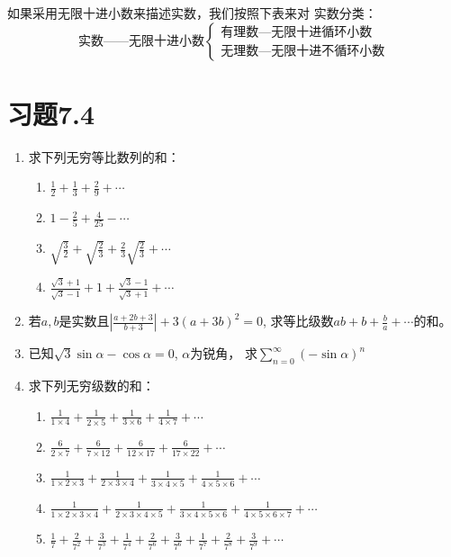 如果采用无限十进小数来描述实数，我们按照下表来对
实数分类：
\[\text{实数——无限十进小数}\begin{cases}
    \text{有理数—无限十进循环小数}\\
    \text{无理数—无限十进不循环小数}
\end{cases}\]

\section*{习题7.4}
\begin{enumerate}
    \item 求下列无穷等比数列的和：
    \begin{multicols}{2}
\begin{enumerate}
    \item $\frac{1}{2}+\frac{1}{3}+\frac{2}{9}+\cdots$
    \item $1-\frac{2}{5}+\frac{4}{25}-\cdots$
    \item $\sqrt{\frac{3}{2}}+\sqrt{\frac{2}{3}}+\frac{2}{3}\sqrt{\frac{2}{3}}+\cdots$
    \item $\frac{\sqrt{3}+1}{\sqrt{3}-1}+1+\frac{\sqrt{3}-1}{\sqrt{3}+1}+\cdots$
\end{enumerate}        
    \end{multicols}


\item 若$a,b$是实数且$\left|\frac{a+2b+3}{b+3}\right|+3(a+3b)^2=0$, 求等比级数$ab+b+\frac{b}{a}+\cdots$的和。
\item 已知$\sqrt{3}\sin\alpha-\cos\alpha=0$, $\alpha$为锐角，
求$\sum^{\infty}_{n=0}(-\sin\alpha)^n$

\item 求下列无穷级数的和：
\begin{enumerate}
\item $\frac{1}{1 \times 4}+\frac{1}{2 \times 5}+\frac{1}{3 \times 6}+\frac{1}{4 \times 7}+\cdots$
\item $\frac{6}{2 \times 7}+\frac{6}{7 \times 12}+\frac{6}{12 \times 17}+\frac{6}{17 \times 22}+\cdots$
\item $\frac{1}{1 \times 2 \times 3}+\frac{1}{2 \times 3 \times 4}+\frac{1}{3 \times 4 \times 5}+\frac{1}{4 \times 5 \times 6}+\cdots$
\item $\frac{1}{1 \times 2 \times 3 \times 4}+\frac{1}{2 \times 3 \times 4 \times 5}+\frac{1}{3 \times 4 \times 5 \times 6}+\frac{1}{4 \times 5 \times 6 \times 7}+\cdots$
\item $\frac{1}{7}+\frac{2}{7^{2}}+\frac{3}{7^{3}}+\frac{1}{7^{4}}+\frac{2}{7^{6}}+\frac{3}{7^{6}}+\frac{1}{7^{7}}+\frac{2}{7^{8}}+\frac{3}{7^{9}}+\cdots$
\end{enumerate}



\end{enumerate}
